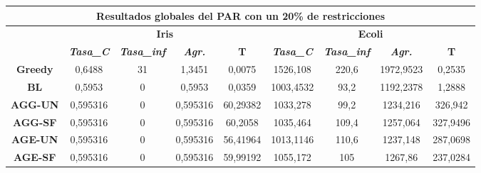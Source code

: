 \documentclass[12pt, spanish]{article}
\begin{document}
\newpage


\begin{table}[H]
\footnotesize
\begin{tabular}{|c|c|c|c|c|c|c|c|c|}
\hline
\multicolumn{9}{|c|}{\textbf{Resultados globales del PAR con un 20\% de restricciones}}                                                                                                                                  \\ \hline
\multirow{2}{*}{}        & \multicolumn{4}{c|}{\textbf{Iris}}                                                            & \multicolumn{4}{c|}{\textbf{Ecoli}}                                                           \\ \cline{2-9} 
                         & \textit{\textbf{Tasa\_C}} & \textit{\textbf{Tasa\_inf}} & \textit{\textbf{Agr.}} & \textbf{T} & \textit{\textbf{Tasa\_C}} & \textit{\textbf{Tasa\_inf}} & \textit{\textbf{Agr.}} & \textbf{T} \\ \hline
\textbf{Greedy}          & 0,6488                    & 31                          & 1,3451                 & 0,0075     & 1526,108                  & 220,6                       & 1972,9523              & 0,2535     \\ \hline
\textbf{BL}              & 0,5953                    & 0                           & 0,5953                 & 0,0359     & 1003,4532                 & 93,2                        & 1192,2378              & 1,2888     \\ \hline
\textbf{AGG-UN}          & 0,595316                  & 0                           & 0,595316               & 60,29382   & 1033,278                  & 99,2                        & 1234,216               & 326,942    \\ \hline
\textbf{AGG-SF}          & 0,595316                  & 0                           & 0,595316               & 60,2058    & 1035,464                  & 109,4                       & 1257,064               & 327,9496   \\ \hline
\textbf{AGE-UN}          & 0,595316                  & 0                           & 0,595316               & 56,41964   & 1013,1146                 & 110,6                       & 1237,148               & 287,0698   \\ \hline
\textbf{AGE-SF}          & 0,595316                  & 0                           & 0,595316               & 59,99192   & 1055,172                  & 105                         & 1267,86                & 237,0284   \\ \hline

\end{tabular}
\end{table}
\end{document}
